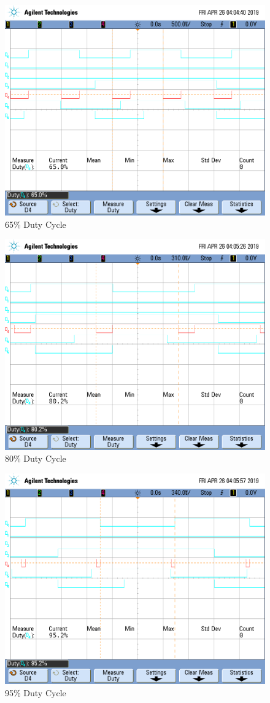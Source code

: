 \documentclass[a4paper, 12pt]{article}
\begin{document}
\begin{figure}[H]
\centering
\includegraphics[width=.8\textwidth]{scope_1.png}
\caption{65\% Duty Cycle}
\label{fig:duty65}
\end{figure}

\begin{figure}[H]
\centering
\includegraphics[width=.8\textwidth]{scope_2.png}
\caption{80\% Duty Cycle}
\label{fig:duty80}
\end{figure}

\begin{figure}[H]
\centering
\includegraphics[width=.8\textwidth]{scope_3.png}
\caption{95\% Duty Cycle}
\label{fig:duty95}
\end{figure}
\end{document}

